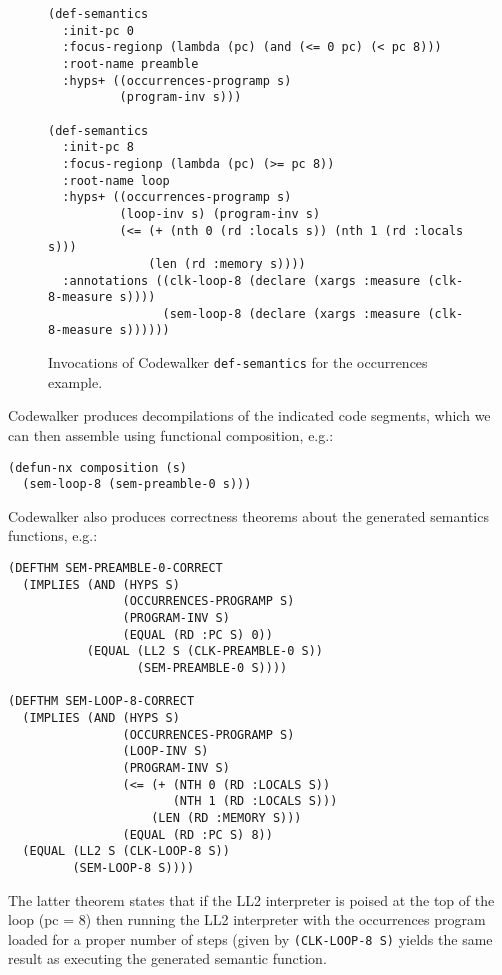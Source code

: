 \documentclass{eptcs}
\begin{document}
\begin{figure*}
\begin{verbatim}
(def-semantics
  :init-pc 0
  :focus-regionp (lambda (pc) (and (<= 0 pc) (< pc 8)))
  :root-name preamble
  :hyps+ ((occurrences-programp s)
          (program-inv s)))

(def-semantics
  :init-pc 8
  :focus-regionp (lambda (pc) (>= pc 8))
  :root-name loop
  :hyps+ ((occurrences-programp s)
          (loop-inv s) (program-inv s)
          (<= (+ (nth 0 (rd :locals s)) (nth 1 (rd :locals s))) 
              (len (rd :memory s))))
  :annotations ((clk-loop-8 (declare (xargs :measure (clk-8-measure s))))
                (sem-loop-8 (declare (xargs :measure (clk-8-measure s))))))
\end{verbatim}
\hrulefill
\caption{Invocations of Codewalker \texttt{def-semantics} for the
  occurrences example.}
\label{def-semantics}
\end{figure*}

Codewalker produces decompilations of the indicated code segments, 
which we can then assemble using functional composition, e.g.:

\begin{verbatim}
(defun-nx composition (s)
  (sem-loop-8 (sem-preamble-0 s)))
\end{verbatim}

Codewalker also produces correctness theorems about the 
generated semantics functions, e.g.:

\begin{verbatim}
(DEFTHM SEM-PREAMBLE-0-CORRECT
  (IMPLIES (AND (HYPS S)
                (OCCURRENCES-PROGRAMP S)
                (PROGRAM-INV S)
                (EQUAL (RD :PC S) 0))
           (EQUAL (LL2 S (CLK-PREAMBLE-0 S))
                  (SEM-PREAMBLE-0 S))))

(DEFTHM SEM-LOOP-8-CORRECT
  (IMPLIES (AND (HYPS S)
                (OCCURRENCES-PROGRAMP S)
                (LOOP-INV S)
                (PROGRAM-INV S)
                (<= (+ (NTH 0 (RD :LOCALS S))
                       (NTH 1 (RD :LOCALS S)))
                    (LEN (RD :MEMORY S)))
                (EQUAL (RD :PC S) 8))
  (EQUAL (LL2 S (CLK-LOOP-8 S))
         (SEM-LOOP-8 S))))
\end{verbatim}

The latter theorem states that if the LL2 interpreter is poised at 
the top of the loop (pc = 8) then running the LL2 interpreter with the
occurrences program loaded for a proper
number of steps (given by \texttt{(CLK-LOOP-8 S)} yields the 
same result as executing the generated semantic function.
\end{document}
